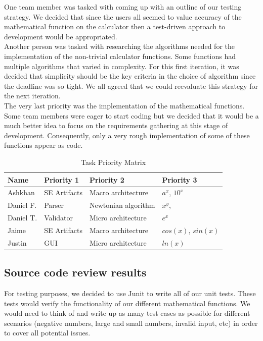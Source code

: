 \documentclass[a4paper, 12pt]{article}
\begin{document}
One team member was tasked with coming up with an outline of our testing strategy. We decided that since the users all seemed to value accuracy of the mathematical function on the calculator then a test-driven approach to development would be appropriated. \\

Another person was tasked with researching the algorithms needed for the implementation of the non-trivial calculator functions. Some functions had multiple algorithms that varied in complexity. For this first iteration, it was decided that simplicity should be the key criteria in the choice of algorithm since the deadline was so tight. We all agreed that we could reevaluate this strategy for the next iteration. \\

The very last priority was the implementation of the mathematical functions. Some team members were eager to start coding but we decided that it would be a much better idea to focus on the requirements gathering at this stage of development. Consequently, only a very rough implementation of some of these functions appear as code. \\

\begin{table}[ht]
\centering
\caption{Task Priority Matrix}
\begin{tabular}{|l|l|l|l|}
\hline
\textbf{Name}&\textbf{Priority 1}  &\textbf{Priority 2}  &\textbf{Priority 3}  \\ \hline
 Ashkhan&SE Artifacts  &Macro architecture  &$a^x$, $10^x$  \\ \hline
 Daniel F.&Parser  &Newtonian algorithm  &$x^y$,   \\ \hline
 Daniel T.&Validator  &Micro architecture  &$e^x$  \\ \hline
 Jaime&SE Artifacts  &Macro architecture  &$cos(x)$, $sin(x)$  \\ \hline
 Justin&GUI  &Micro architecture  &$ln(x)$  \\ \hline
\end{tabular}
\end{table}

\subsection{Source code review results}

For testing purposes, we decided to use Junit to write all of our unit tests. These tests would verify the functionality of our different mathematical functions. We would need to think of and write up as many test cases as possible for different scenarios (negative numbers, large and small numbers, invalid input, etc) in order to cover all potential issues. \\
\end{document}
